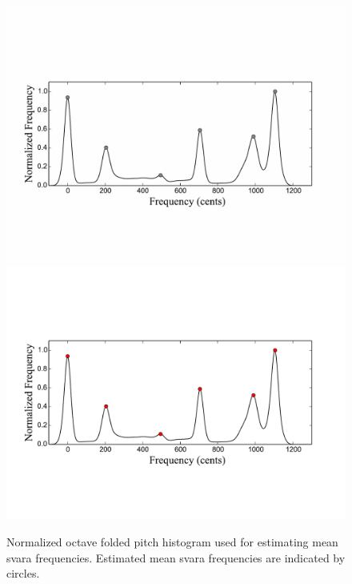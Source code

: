 {\begin{figure}
	\begin{center}
		\ifdefined\PRINTVER
			\includegraphics[width=\figSizeEighty]{ch05_preprocessing/figures/swarOnHistogramForNyasSegmentation_BW.pdf}
		\else
			\includegraphics[width=\figSizeEighty]{ch05_preprocessing/figures/swarOnHistogramForNyasSegmentation.pdf}
		\fi
	\end{center}
	\caption[Example of a normalized octave folded pitch histogram]{Normalized octave folded pitch histogram used for estimating mean \gls{svara} frequencies. Estimated mean \gls{svara} frequencies are indicated by circles.}
	\label{fig:pitch_histogram_nyas_segmentation}
\end{figure}

}
